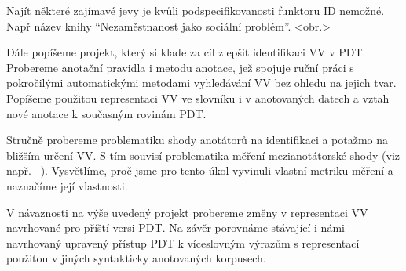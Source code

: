 \documentclass[12pt]{article}
\begin{document}
Najít některé zajímavé jevy je kvůli podspecifikovanosti funktoru ID nemožné. Např název knihy ``Nezaměstnanost jako sociální problém''. <obr.>

Dále popíšeme projekt, který si klade za cíl zlepšit identifikaci VV v PDT. Probereme anotační pravidla i metodu anotace, jež spojuje ruční práci s pokročilými automatickými metodami vyhledávání VV bez ohledu na jejich tvar. Popíšeme použitou representaci VV ve slovníku i v anotovaných datech a vztah nové anotace k současným rovinám PDT.

Stručně probereme problematiku shody anotátorů na identifikaci a potažmo na bližším určení VV. S tím souvisí %
problematika měření mezianotátorské shody (viz např. ~\citet{artstein:2007}). Vysvětlíme, proč jsme pro tento úkol vyvinuli vlastní metriku měření a naznačíme její vlastnosti.

V návaznosti na výše uvedený projekt probereme změny v representaci VV navrhované pro příští versi PDT. Na závěr porovnáme stávající i námi navrhovaný upravený přístup PDT k víceslovným výrazům s representací použitou v jiných syntakticky anotovaných korpusech.



\end{document}
